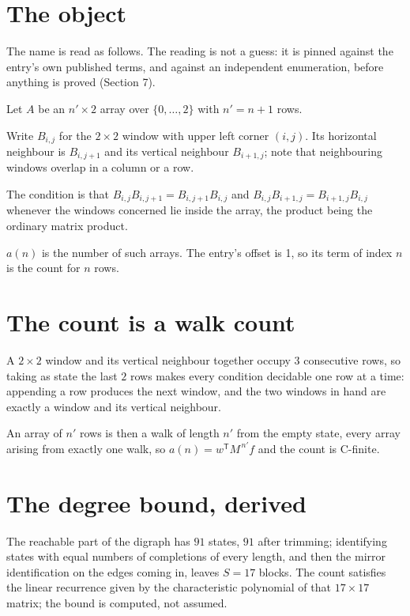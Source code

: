 \documentclass[11pt]{article}
\theoremstyle{definition}
\begin{document}
\section{The object}

The name is read as follows. The reading is not a guess: it is pinned against the entry's own published terms, and against an independent enumeration, before anything is proved (Section 7).

Let $A$ be an $n' \times 2$ array over $\{0,\dots,2\}$ with $n' = n + 1$ rows.

Write $B_{i,j}$ for the $2\times2$ window with upper left corner $(i,j)$. Its horizontal neighbour is $B_{i,j+1}$ and its vertical neighbour $B_{i+1,j}$; note that neighbouring windows overlap in a column or a row.

The condition is that $B_{i,j}B_{i,j+1} = B_{i,j+1}B_{i,j}$ and $B_{i,j}B_{i+1,j} = B_{i+1,j}B_{i,j}$ whenever the windows concerned lie inside the array, the product being the ordinary matrix product.

$a(n)$ is the number of such arrays. The entry's offset is 1, so its term of index $n$ is the count for $n$ rows.

\section{The count is a walk count}

A $2\times2$ window and its vertical neighbour together occupy $3$ consecutive rows, so taking as state the last $2$ rows makes every condition decidable one row at a time: appending a row produces the next window, and the two windows in hand are exactly a window and its vertical neighbour.

An array of $n'$ rows is then a walk of length $n'$ from the empty state, every array arising from exactly one walk, so $a(n) = w^{\mathsf T}M^{\,n'}f$ and the count is C-finite.

\section{The degree bound, derived}

The reachable part of the digraph has $91$ states, $91$ after trimming; identifying states with equal numbers of completions of every length, and then the mirror identification on the edges coming in, leaves $S = 17$ blocks. The count satisfies the linear recurrence given by the characteristic polynomial of that $17\times17$ matrix; the bound is computed, not assumed.
\end{document}

